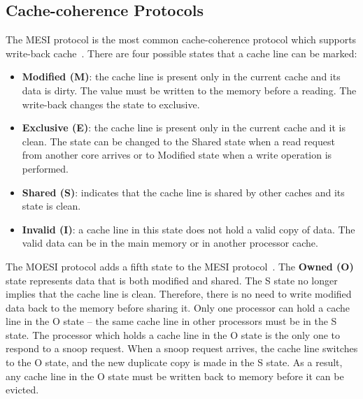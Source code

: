 \documentclass[conference]{IEEEtran}
\begin{document}
\subsection{Cache-coherence Protocols}

The MESI protocol is the most common cache-coherence protocol which supports write-back cache~\cite{Patterson:06}. There are four possible states that a cache line can be marked:

\begin{itemize}
\item \textbf{Modified (M)}: the cache line is present only in the current cache and its data is dirty. The value must be written to the memory before a reading. The write-back changes the state to exclusive.
\item \textbf{Exclusive (E)}: the cache line is present only in the current cache and it is clean. The state can be changed to the Shared state when a read request from another core arrives or to Modified state when a write operation is performed.
\item \textbf{Shared (S)}: indicates that the cache line is shared by other caches and its state is clean. 
\item \textbf{Invalid (I)}: a cache line in this state does not hold a valid copy of data. The valid data can be in the main memory or in another processor cache.
\end{itemize}

The MOESI protocol adds a fifth state to the MESI protocol~\cite{amd64}. The \textbf{Owned (O)} state represents data that is both modified and shared. The S state no longer implies that the cache line is clean. Therefore, there is no need to write modified data back to the memory before sharing it. Only one processor can hold a cache line in the O state -- the same cache line in other processors must be in the S state. The processor which holds a cache line in the O state is the only one to respond to a snoop request. When a snoop request arrives, the cache line switches to the O state, and the new duplicate copy is made in the S state. As a result, any cache line in the O state must be written back to memory before it can be evicted. 
\end{document}
